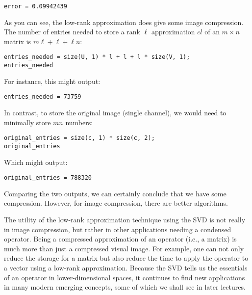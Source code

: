 \documentclass{ximera}
\begin{document}
\begin{problem}
\begin{problem}
\begin{verbatim}
error = 0.09942439
\end{verbatim}

As you can see, the low-rank approximation does give some image compression. The number of entries needed to store a rank \( \ell \) approximation \( cl \) of an \( m \times n \) matrix is \( m\ell + \ell + \ell n \):

\begin{verbatim}
entries_needed = size(U, 1) * l + l + l * size(V, 1);
entries_needed
\end{verbatim}

For instance, this might output:

\begin{verbatim}
entries_needed = 73759
\end{verbatim}

In contrast, to store the original image (single channel), we would need to minimally store \( mn \) numbers:

\begin{verbatim}
original_entries = size(c, 1) * size(c, 2);
original_entries
\end{verbatim}

Which might output:

\begin{verbatim}
original_entries = 788320
\end{verbatim}

Comparing the two outputs, we can certainly conclude that we have some compression. However, for image compression, there are better algorithms.

The utility of the low-rank approximation technique using the SVD is not really in image compression, but rather in other applications needing a condensed operator. Being a compressed approximation of an operator (i.e., a matrix) is much more than just a compressed visual image. For example, one can not only reduce the storage for a matrix but also reduce the time to apply the operator to a vector using a low-rank approximation. Because the SVD tells us the essentials of an operator in lower-dimensional spaces, it continues to find new applications in many modern emerging concepts, some of which we shall see in later lectures.
 

\end{problem}
\end{problem}
\end{document}
